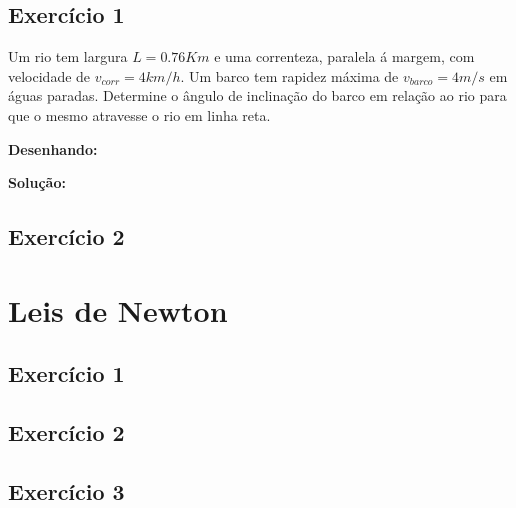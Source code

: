 \documentclass[12pt, a4paper]{article} %
\begin{document}
        \subsection{Exerc\'icio 1}
            Um rio tem largura $L=0.76Km$ e uma correnteza, paralela \'a margem, com velocidade de $v_{corr}=4km/h$. Um barco tem rapidez m\'axima de $v_{barco}=4m/s$ em \'aguas paradas. Determine o \^angulo de inclina\c{c}\~ao do barco em rela\c{c}\~ao ao rio para que o mesmo atravesse o rio em linha reta.

            \textbf{Desenhando:}

            \textbf{Solu\c{c}\~ao:}


      
    \subsection{Exerc\'icio 2}

     
\section{Leis de Newton}

    \subsection{Exerc\'icio 1}


    \subsection{Exerc\'icio 2}


    \subsection{Exerc\'icio 3}

       
\end{document}
